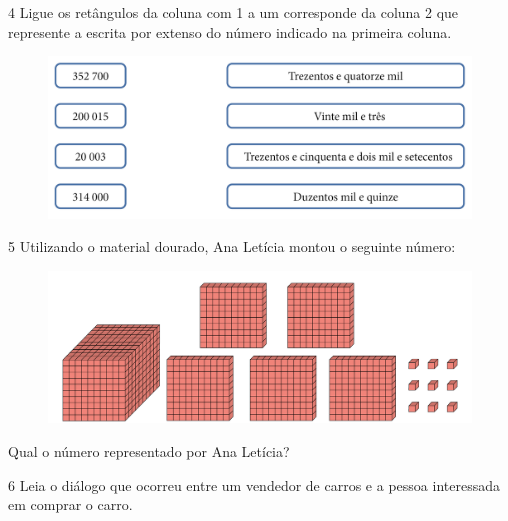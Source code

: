 
\pagebreak
\num{4} Ligue os retângulos da coluna com 1 a um corresponde da coluna 2
que represente a escrita por extenso do número indicado na primeira
coluna.

\begin{figure}[htpb!]
\includegraphics[width=\textwidth]{../ilustracoes/MAT5/SAEB_5ANO_MAT_figura3.png}
\end{figure}


\num{5} Utilizando o material dourado, Ana Letícia montou o seguinte número:

\begin{figure}[htpb!]
\centering
\includegraphics[width=\textwidth]{../ilustracoes/MAT5/SAEB_5ANO_MAT_figura4.png}
\end{figure}

Qual o número representado por Ana Letícia?


\pagebreak  
\num{6} Leia o diálogo que ocorreu entre um vendedor de carros e a pessoa interessada em comprar o carro.

